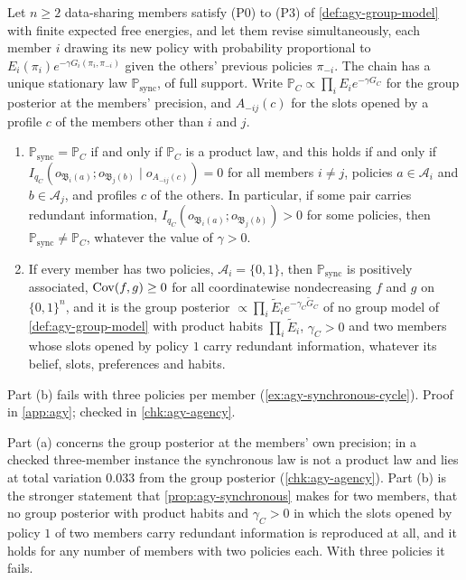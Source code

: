 \begin{proposition}\label{prop:agy-synchronous-exact}
Let $n\ge2$ data-sharing members satisfy (P0) to (P3) of \cref{def:agy-group-model} with finite expected free energies, and let them revise simultaneously, each member $i$ drawing its new policy with probability proportional to $E_i(\pi_i)e^{-\gamma G_i(\pi_i,\pi_{-i})}$ given the others' previous policies $\pi_{-i}$. The chain has a unique stationary law $\mathbb P_{\mathrm{sync}}$, of full support. Write $\mathbb P_C\propto\prod_iE_ie^{-\gamma G_C}$ for the group posterior at the members' precision, and $A_{-ij}(c)$ for the slots opened by a profile $c$ of the members other than $i$ and $j$.
\begin{enumerate}
\item[(a)] $\mathbb P_{\mathrm{sync}}=\mathbb P_C$ if and only if $\mathbb P_C$ is a product law, and this holds if and only if $I_{q_C}(o_{\mathfrak B_i(a)};o_{\mathfrak B_j(b)}\mid o_{A_{-ij}(c)})=0$ for all members $i\ne j$, policies $a\in\mathcal A_i$ and $b\in\mathcal A_j$, and profiles $c$ of the others. In particular, if some pair carries redundant information, $I_{q_C}(o_{\mathfrak B_i(a)};o_{\mathfrak B_j(b)})>0$ for some policies, then $\mathbb P_{\mathrm{sync}}\ne\mathbb P_C$, whatever the value of $\gamma>0$.
\item[(b)] If every member has two policies, $\mathcal A_i=\{0,1\}$, then $\mathbb P_{\mathrm{sync}}$ is positively associated, $\operatorname{Cov}(f,g)\ge0$ for all coordinatewise nondecreasing $f$ and $g$ on $\{0,1\}^n$, and it is the group posterior $\propto\prod_i\tilde E_ie^{-\gamma_C\tilde G_C}$ of no group model of \cref{def:agy-group-model} with product habits $\prod_i\tilde E_i$, $\gamma_C>0$ and two members whose slots opened by policy $1$ carry redundant information, whatever its belief, slots, preferences and habits.
\end{enumerate}
Part (b) fails with three policies per member (\cref{ex:agy-synchronous-cycle}). Proof in \cref{app:agy}; checked in \cref{chk:agy-agency}.
\end{proposition}

Part (a) concerns the group posterior at the members' own precision; in a checked three-member instance the synchronous law is not a product law and lies at total variation $0.033$ from the group posterior (\cref{chk:agy-agency}). Part (b) is the stronger statement that \cref{prop:agy-synchronous} makes for two members, that no group posterior with product habits and $\gamma_C>0$ in which the slots opened by policy $1$ of two members carry redundant information is reproduced at all, and it holds for any number of members with two policies each. With three policies it fails.

